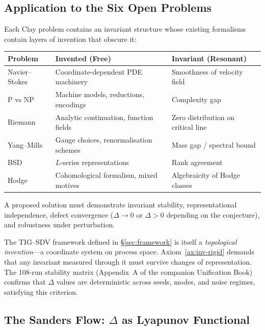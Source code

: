 \documentclass[11pt]{article}
\begin{document}
\subsection{Application to the Six Open Problems}
\label{sec:found-clay}

Each Clay problem contains an invariant structure whose existing formalisms contain
layers of invention that obscure it:

\begin{center}
\begin{tabular}{@{}lll@{}}
\toprule
\textbf{Problem} & \textbf{Invented (Free)} & \textbf{Invariant (Resonant)} \\
\midrule
Navier--Stokes & Coordinate-dependent PDE machinery & Smoothness of velocity field \\
P vs NP        & Machine models, reductions, encodings & Complexity gap \\
Riemann        & Analytic continuation, function fields & Zero distribution on critical line \\
Yang--Mills    & Gauge choices, renormalisation schemes & Mass gap / spectral bound \\
BSD            & $L$-series representations & Rank agreement \\
Hodge          & Cohomological formalism, mixed motives & Algebraicity of Hodge classes \\
\bottomrule
\end{tabular}
\end{center}

\begin{axiom}\label{ax:coherence-crit}
A proposed solution must demonstrate invariant stability, representational independence,
defect convergence ($\Delta \to 0$ or $\Delta > 0$ depending on the conjecture), and
robustness under perturbation.
\end{axiom}

\noindent
The TIG--SDV framework defined in \S\ref{sec:framework} is itself a \emph{topological
invention}---a coordinate system on process space. Axiom~\ref{ax:inv-rigid} demands
that any invariant measured through it must survive changes of representation. The
108-run stability matrix (Appendix~A of the companion Unification Book) confirms that
$\Delta$ values are deterministic across seeds, modes, and noise regimes, satisfying
this criterion.

\subsection{The Sanders Flow: $\Delta$ as Lyapunov Functional}
\label{sec:sanders-flow}
\end{document}
